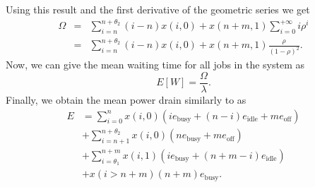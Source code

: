 Using this result and the first derivative of the geometric series we get 
\begin{eqnarray*}
\Omega &=& \sum_{i=n}^{n+\theta_2} (i-n)x(i,0) + x(n+m,1)\sum_{i=0}^{+\infty} i\rho^i\nonumber\\
&=& \sum_{i=n}^{n+\theta_2} (i-n)x(i,0) + x(n+m,1)\frac{\rho}{(1-\rho)^2}.
\end{eqnarray*}
Now, we can give the mean waiting time for all jobs in the system as
\begin{equation*}
E[W] = \frac{\Omega}{\lambda}.
\end{equation*}
Finally, we obtain the mean power drain similarly to  as
\begin{align*}
E& = \sum_{i=0}^{n} x(i,0)(i e_\text{busy} + (n-i)e_\text{idle} + m e_\text{off})\\
&+ \sum_{i=n+1}^{n+\theta_2} x(i,0)(ne_\text{busy}+me_\text{off})\nonumber\\
&+\sum_{i=\theta_1}^{n+m} x(i,1)(i e_\text{busy} + (n+m-i)e_\text{idle})\nonumber\\
&+x(i > n+m)(n+m)e_\text{busy}.\nonumber
\end{align*}
